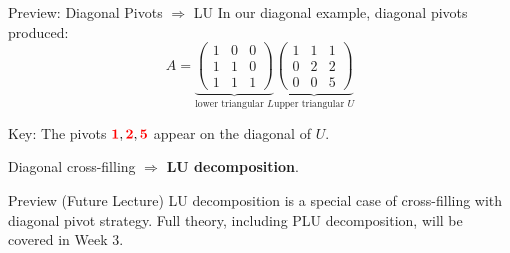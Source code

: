 \documentclass[10pt]{beamer}
\theoremstyle{definition}
\newcommand{\pvt}[1]{{\color{red}\mathbf{#1}}}       %
\newcommand{\x}[1]{\alert{\textbf{#1}}}
\begin{document}
\begin{frame}{Preview: Diagonal Pivots $\Rightarrow$ LU}
In our diagonal example, diagonal pivots produced:
$$A = \underbrace{\begin{pmatrix}
1 & 0 & 0 \\
1 & 1 & 0 \\
1 & 1 & 1
\end{pmatrix}}_{\text{lower triangular } L}
\underbrace{\begin{pmatrix}
1 & 1 & 1 \\
0 & 2 & 2 \\
0 & 0 & 5
\end{pmatrix}}_{\text{upper triangular } U}$$

\vfill
Key: The pivots $\pvt{1}, \pvt{2}, \pvt{5}$ appear on the diagonal of $U$.

\vfill
Diagonal cross-filling $\Longrightarrow$ \x{LU decomposition}.

\vfill
\begin{alertblock}{Preview (Future Lecture)}
LU decomposition is a special case of cross-filling with diagonal pivot strategy.
Full theory, including PLU decomposition, will be covered in Week 3.
\end{alertblock}
\end{frame}
\end{document}

